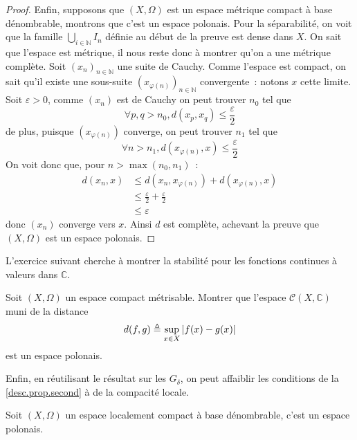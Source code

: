 \begin{proof}
  Enfin, supposons que $(X,\Omega)$ est un espace métrique compact à base
  dénombrable, montrons que c'est un espace polonais. Pour la séparabilité,
  on voit que la famille $\bigcup_{i \in \mathbb N} I_n$ définie au début de la
  preuve est dense dans $X$. On sait que l'espace est métrique, il nous reste
  donc à montrer qu'on a une métrique complète. Soit $(x_n)_{n\in\mathbb N}$
  une suite de Cauchy. Comme l'espace est compact, on sait qu'il existe une
  sous-suite $(x_{\varphi(n)})_{n\in\mathbb N}$ convergente~: notons $x$ cette
  limite. Soit $\varepsilon > 0$, comme $(x_n)$ est de Cauchy on peut trouver
  $n_0$ tel que
  \[\forall p,q > n_0, d(x_p,x_q) \leq \frac{\varepsilon}{2}\]
  de plus, puisque $(x_{\varphi(n)})$ converge, on peut trouver $n_1$ tel que
  \[\forall n > n_1, d(x_{\varphi(n)},x) \leq \frac{\varepsilon}{2}\]
  On voit donc que, pour $n > \max(n_0,n_1)$~:
  \begin{align*}
    d(x_n,x) &\leq d(x_n,x_{\varphi(n)}) + d(x_{\varphi(n)},x)\\
    &\leq \frac{\varepsilon}{2} + \frac{\varepsilon}{2}\\
    &\leq\varepsilon
  \end{align*}
  donc $(x_n)$ converge vers $x$. Ainsi $d$ est complète, achevant la preuve
  que $(X,\Omega)$ est un espace polonais.
\end{proof}

L'exercice suivant cherche à montrer la stabilité pour les fonctions continues à
valeurs dans $\mathbb C$.

\begin{exercise}
  Soit $(X,\Omega)$ un espace compact métrisable. Montrer que l'espace
  $\mathcal C(X,\mathbb C)$ muni de la distance
  \[d(f,g) \triangleq \sup_{x \in X}|f(x) - g(x)|\]
  est un espace polonais.
\end{exercise}

Enfin, en réutilisant le résultat sur les $G_\delta$, on peut affaiblir les
conditions de la \cref{desc.prop.second} à de la compacité locale.

\begin{proposition}
  Soit $(X,\Omega)$ un espace localement compact à base dénombrable, c'est un
  espace polonais.
\end{proposition}


